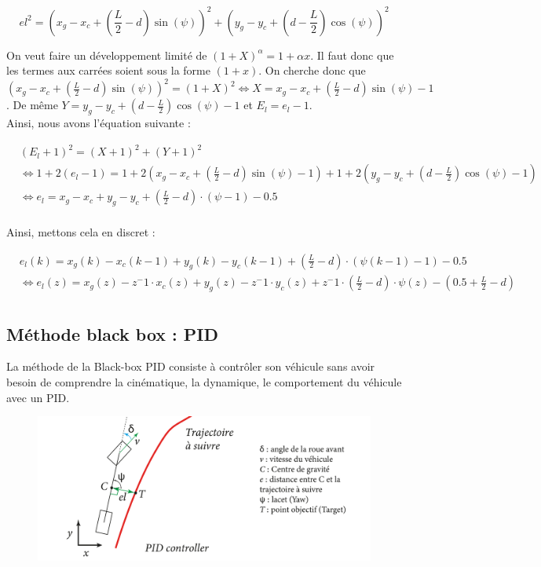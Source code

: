 \documentclass[a4paper,12pt]{extarticle}
\begin{document}
\begin{equation*}
    el^2 = (x_g - x_c + (\frac{L}{2}-d)\sin(\psi))^2 + (y_g - y_c + (d-\frac{L}{2})\cos(\psi))^2
\end{equation*}

On veut faire un développement limité de $(1+X)^\alpha = 1 + \alpha x $. Il faut donc que les termes aux carrées soient sous la forme $(1+x)$. 
On cherche donc que $(x_g - x_c + (\frac{L}{2}-d)\sin(\psi))^2 = (1+X)^2 \iff X =x_g - x_c + (\frac{L}{2}-d)\sin(\psi)-1$. 
De même $Y = y_g - y_c + (d-\frac{L}{2})\cos(\psi) - 1$ et $E_l = e_l -1$.\\ Ainsi, nous avons l'équation suivante :

\begin{align*}
    & (E_l+1)^2=(X+1)^2+(Y+1)^2 \\
    & \iff 1+2(e_l-1)=1+2(x_g -x_c +(\frac{L}{2}-d)\sin(\psi)-1)+1+2(y_g-y_c+(d-\frac{L}{2})\cos(\psi)-1)\\
    & \iff e_l=x_g-x_c+y_g-y_c+(\frac{L}{2}-d)\cdot(\psi-1) - 0.5\\
\end{align*}

Ainsi, mettons cela en discret : 

\begin{align*}
    &e_l(k)=x_g(k)-x_c(k-1)+y_g(k)-y_c(k-1)+(\frac{L}{2}-d)\cdot(\psi(k-1)-1) - 0.5\\
    &\iff  \boxed{e_l(z)=x_g(z)-z^-1\cdot x_c(z) +y_g(z) - z^-1\cdot y_c(z) + z^-1\cdot(\frac{L}{2}-d)\cdot \psi(z) - (0.5 + \frac{L}{2}-d)}\\
\end{align*}

\subsection{Méthode black box : PID}
La méthode de la Black-box PID consiste à contrôler son véhicule sans avoir besoin de comprendre la cinématique, la dynamique, le comportement du véhicule avec un PID.

\begin{figure}[h!]
    \centering
    \includegraphics[width=1\textwidth]{image/PID.png}\\
\end{figure}
\end{document}
